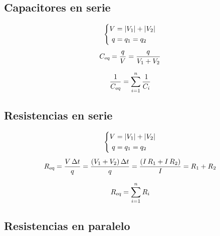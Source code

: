 \subsection{Capacitores en serie}

\begin{gather*}
    \left\{
    \begin{aligned}
        V &= {\left| {V_1} \right|} + {\left| {V_2} \right|}
        \\
        q &= q_1 = q_2
    \end{aligned}
    \right.
    \\[1ex]
    {{C}_\textsl{{eq}}} = \frac{q}{V} = \frac{q}{V_1 + V_2}
\end{gather*}

\begin{mdframed}[style=MyFrame1]
    \begin{prop}
    \end{prop}
    \begin{equation*}
        \frac{1}{{{C}_\textsl{{eq}}}} = \sum_{i=1}^n \frac{1}{C_i}
    \end{equation*}
\end{mdframed}


\subsection{Resistencias en serie}

\begin{gather*}
    \left\{
    \begin{aligned}
        V &= {\left| {V_1} \right|} + {\left| {V_2} \right|}
        \\
        q &= q_1 = q_2
    \end{aligned}
    \right.
    \\[1ex]
    {{R}_\textsl{{eq}}} = \frac{V \, \Delta t}{q} = \frac{\left(V_1 + V_2\right) \Delta t}{q} = \frac{\left(I \, R_1 + I \, R_2\right)}{I} = R_1 + R_2
\end{gather*}

\begin{mdframed}[style=MyFrame1]
    \begin{prop}
    \end{prop}
    \begin{equation*}
        {{R}_\textsl{{eq}}} = \sum_{i=1}^n R_i
    \end{equation*}
\end{mdframed}


\subsection{Resistencias en paralelo}

